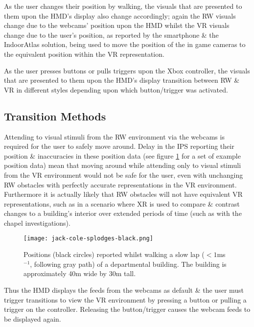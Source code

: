 As the user changes their position by walking, the visuals that are presented to them upon the HMD's display also change accordingly; again the RW visuals change due to the webcams' position upon the HMD whilst the VR visuals change due to the user's position, as reported by the smartphone \& the IndoorAtlas solution, being used to move the position of the in game cameras to the equivalent position within the VR representation.

As the user presses buttons or pulls triggers upon the Xbox controller, the visuals that are presented to them upon the HMD's display transition between RW \& VR in different styles depending upon which button/trigger was activated.


\subsection{Transition Methods}
Attending to visual stimuli from the RW environment via the webcams is required for the user to safely move around. Delay in the IPS reporting their position \& inaccuracies in these position data (see figure \ref{jack-cole-splodges} for a set of example position data) mean that moving around while attending only to visual stimuli from the VR environment would not be safe for the user, even with unchanging RW obstacles with perfectly accurate representations in the VR environment. Furthermore it is actually likely that RW obstacles will not have equivalent VR representations, such as in a scenario where XR is used to compare \& contrast changes to a building's interior over extended periods of time (such as with the chapel investigations).

\begin{figure}[h]
	\begin{center}
		\texttt{[image: jack-cole-splodges-black.png]}
		\caption{Positions (black circles) reported whilst walking a slow lap ($<1$ms$^{-1}$, following gray path) of a departmental building. The building is approximately 40m wide by 30m tall.}
		\label{jack-cole-splodges}
	\end{center}
\end{figure}

Thus the HMD displays the feeds from the webcams as default \& the user must trigger transitions to view the VR environment by pressing a button or pulling a trigger on the controller. Releasing the button/trigger causes the webcam feeds to be displayed again.

